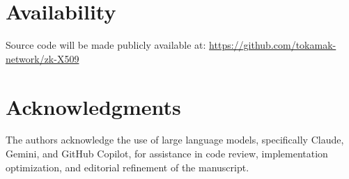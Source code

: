 \documentclass[11pt, a4paper]{article}
\begin{document}
\section*{Availability}

Source code will be made publicly available at:
\url{https://github.com/tokamak-network/zk-X509}

\section*{Acknowledgments}

The authors acknowledge the use of large language models, specifically Claude, Gemini, and GitHub Copilot, for assistance in code review, implementation optimization, and editorial refinement of the manuscript.



\end{document}
